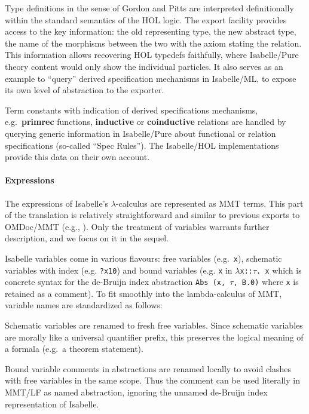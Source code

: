 Type definitions in the sense of Gordon and
  Pitts \cite{pitts93} are interpreted
  definitionally within the standard semantics of the HOL
  logic. The export facility provides access to the key
  information: the old representing type, the new abstract type, the
  name of the morphisms between the two with the axiom stating the
  relation.
  This information allows recovering HOL typedefs faithfully, where
  Isabelle/Pure theory content would only show the individual
  particles. It also serves as an example to ``query'' derived
  specification mechanisms in Isabelle/ML, to expose its own level of
  abstraction to the exporter.
  
Term constants with indication of derived specifications
  mechanisms, e.g.\ \textbf{primrec} functions, \textbf{inductive} or
  \textbf{coinductive} relations are handled by querying generic
  information in Isabelle/Pure about functional or relation
  specifications (so-called ``Spec Rules''). The Isabelle/HOL
  implementations provide this data on their own account.

\paragraph{Expressions}
The expressions of Isabelle's $\lambda$-calculus are represented as MMT terms.
This part of the translation is relatively straightforward and similar to previous exports to OMDoc/MMT (e.g., \cite{KalRab:hollight:14,KohMueOwr:mpagsiuf17,MueRabSac:cltg19}).
Only the treatment of variables warrants further description, and we focus on it in the sequel.

Isabelle variables come in various flavours: free variables (e.g.\
\verb,x,), schematic variables with index (e.g. \verb,?x10,) and bound
variables (e.g. \verb,x, in $\lambda$\verb,x::,$\tau$\verb,. x, which
is concrete syntax for the de-Bruijn index abstraction
\verb;Abs (x, ;$\tau$\verb;, B.0); where \verb,x, is retained as a
comment). To fit smoothly into the lambda-calculus of MMT, variable
names are standardized as follows:

Schematic variables are renamed to fresh free variables. Since
  schematic variables are morally like a universal quantifier prefix,
  this preserves the logical meaning of a formala (e.g.\ a theorem
  statement).

Bound variable comments in abstractions are renamed locally to
  avoid clashes with free variables in the same scope. Thus the
  comment can be used literally in MMT/LF as named abstraction,
  ignoring the unnamed de-Bruijn index representation of Isabelle.

